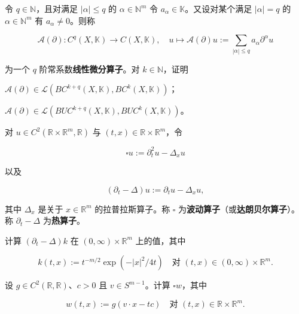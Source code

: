 \begin{exercises}
令 $ q \in \mathbb{N} $，且对满足 $ |\alpha| \le q $ 的 $ \alpha \in \mathbb{N}^{m} $ 令 $ a_{\alpha} \in \mathbb{K} $。又设对某个满足 $ |\alpha| = q $ 的 $ \alpha \in \mathbb{N}^{m} $ 有 $ a_{\alpha} \ne 0 $。则称

\[
\mathcal{A}(\partial) : C^{q}(X, \mathbb{K}) \to C(X, \mathbb{K}) , \quad u \mapsto \mathcal{A}(\partial)u := \sum_{|\alpha| \le q}a_{\alpha}\partial^{\alpha}u
\]

为一个 $ q $ 阶常系数\textbf{线性微分算子}。对 $ k \in \mathbb{N} $，证明

\begin{items}
\item

$ \mathcal{A}(\partial) \in \mathcal{L}\left( BC^{k+q}(X, \mathbb{K}), BC^{k}(X, \mathbb{K}) \right) $；

\item

$ \mathcal{A}(\partial) \in \mathcal{L}\left( BUC^{k+q}(X, \mathbb{K}), BUC^{k}(X, \mathbb{K}) \right) $。

\end{items}

\item

对 $ u \in C^{2}(\mathbb{R} \times \mathbb{R}^{m}, \mathbb{R}) $ 与 $ (t, x) \in \mathbb{R} \times \mathbb{R}^{m} $，令

\[
\square u := \partial_{t}^{2}u - \Delta_{x}u
\]

以及

\[
(\partial_{t} - \Delta)u := \partial_{t}u - \Delta_{x}u ,
\]

其中 $ \Delta_{x} $ 是关于 $ x \in \mathbb{R}^{m} $ 的拉普拉斯算子。称 $ \square $ 为\textbf{波动算子}（或\textbf{达朗贝尔算子}）。称 $ \partial_{t} - \Delta $ 为\textbf{热算子}。

\begin{items}
\item

计算 $ (\partial_{t} - \Delta)k $ 在 $ (0, \infty) \times \mathbb{R}^{m} $ 上的值，其中

\[
k(t, x) := t^{-m/2}\exp\left( -|x|^{2}/4t \right) \quad \text{对 } (t, x) \in (0, \infty) \times \mathbb{R}^{m} .
\]
\item

设 $ g \in C^{2}(\mathbb{R}, \mathbb{R}) $、$ c > 0 $ 且 $ v \in S^{m-1} $。计算 $ \square w $，其中

\[
w(t, x) := g(v \cdot x - tc) \quad \text{对 } (t, x) \in \mathbb{R} \times \mathbb{R}^{m} .
\]
\end{items}


\end{exercises}

